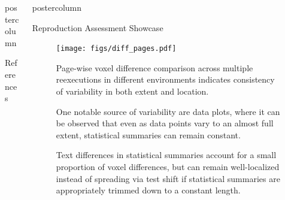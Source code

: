 \begin{frame}
\begin{columns}
\begin{column}{.42\textwidth}
\begin{beamercolorbox}[center]{postercolumn}
\begin{minipage}{.98\textwidth}
{\begin{myblock}{References}
\begin{minipage}{.69\textwidth}
                                                        
                                                        
						\end{minipage}
					\end{myblock}\vfill
		}\end{minipage}\end{beamercolorbox}
	\end{column}
	\begin{column}{.59\textwidth}
		\begin{beamercolorbox}[center]{postercolumn}
			\begin{minipage}{.98\textwidth} %
				\parbox[t][\columnheight]{\textwidth}{ %
					\begin{myblock}{Reproduction Assessment Showcase}
						\vspace{-0.45em}
						\begin{minipage}{.58\textwidth}
						\begin{figure}
							\texttt{[image: figs/diff\_pages.pdf]}
							\vspace{0.2em}
							\caption{
								Page-wise voxel difference comparison across multiple reexecutions in different environments indicates consistency of variability in both extent and location.
							}
							\label{fig:ras_s}
						\end{figure}
						\begin{figure}
							\vspace{0.2em}
							\caption{
								One notable source of variability are data plots, where it can be observed that even as data points vary to an almost full extent, statistical summaries can remain constant.
							}
						\end{figure}
						\end{minipage}
						\hfill
						\begin{minipage}{.38\textwidth}
						\vspace{1.3em}
						\begin{figure}
							\vspace{0.5em}
							\caption{
								Text differences in statistical summaries account for a small proportion of voxel differences, but can remain well-localized instead of spreading via test shift if statistical summaries are appropriately trimmed down to a constant length.
}
\end{figure}
\end{minipage}
\end{myblock}}
\end{minipage}
\end{beamercolorbox}
\end{column}
\end{columns}
\end{frame}
